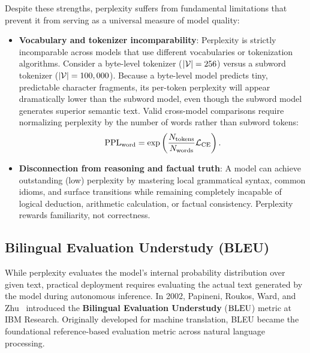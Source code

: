 \documentclass[../../../main.tex]{subfiles}
\begin{document}
Despite these strengths, perplexity suffers from fundamental limitations that prevent it from serving as a universal measure of model quality:
\begin{itemize}
    \item \textbf{Vocabulary and tokenizer incomparability}: Perplexity is strictly incomparable across models that use different vocabularies or tokenization algorithms. Consider a byte-level tokenizer ($|\mathcal{V}| = 256$) versus a subword tokenizer ($|\mathcal{V}| = 100,000$). Because a byte-level model predicts tiny, predictable character fragments, its per-token perplexity will appear dramatically lower than the subword model, even though the subword model generates superior semantic text. Valid cross-model comparisons require normalizing perplexity by the number of words rather than subword tokens:
    \begin{equation}
    \label{eq:word_level_normalized_ppl}
    \mathrm{PPL}_{\text{word}} = \exp\left( \frac{N_{\text{tokens}}}{N_{\text{words}}} \mathcal{L}_{\text{CE}} \right).
    \end{equation}
    \item \textbf{Disconnection from reasoning and factual truth}: A model can achieve outstanding (low) perplexity by mastering local grammatical syntax, common idioms, and surface transitions while remaining completely incapable of logical deduction, arithmetic calculation, or factual consistency. Perplexity rewards familiarity, not correctness.
\end{itemize}

\subsection{Bilingual Evaluation Understudy (BLEU)}
\label{subsec:bleu}

While perplexity evaluates the model's internal probability distribution over given text, practical deployment requires evaluating the actual text generated by the model during autonomous inference. In 2002, Papineni, Roukos, Ward, and Zhu~\cite{papineni2002bleu} introduced the \textbf{Bilingual Evaluation Understudy} ($\mathrm{BLEU}$) metric at IBM Research. Originally developed for machine translation, BLEU became the foundational reference-based evaluation metric across natural language processing.
\end{document}
